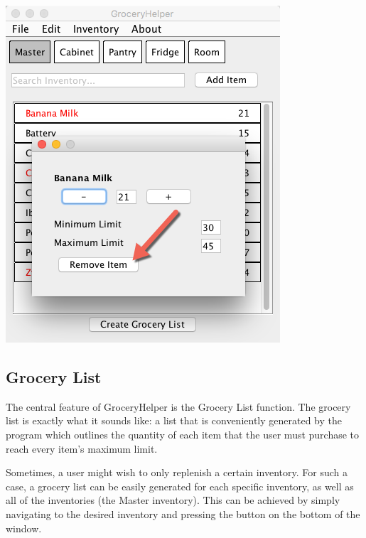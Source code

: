 \documentclass[letterpaper,12pt]{article}
\begin{document}
\centerline{\includegraphics[scale=0.5]{13.png}}


	\subsection{Grocery List}
		The central feature of GroceryHelper is the Grocery List function. The grocery list is exactly what it sounds like: a list that is conveniently generated by the program which outlines the quantity of each item that the user must purchase to reach every item's maximum limit.

Sometimes, a user might wish to only replenish a certain inventory. For such a case, a grocery list can be easily generated for each specific inventory, as well as all of the inventories (the Master inventory). This can be achieved by simply navigating to the desired inventory and pressing the  button on the bottom of the window. \\
\end{document}
